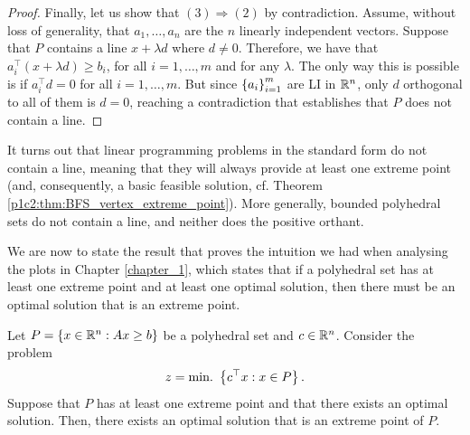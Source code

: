 \begin{proof}
	Finally, let us show that $(3) \Rightarrow (2)$ by contradiction. Assume, without loss of generality, that $a_1, \dots, a_n$ are the $n$ linearly independent vectors. Suppose that $P$ contains a line $x + \lambda d$ where $d \neq 0$. Therefore, we have that $a_i^\top (x+\lambda d) \ge b_i$, for all $i = 1, \dots, m$ and for any $\lambda$. The only way this is possible is if $a_i^\top d =0$ for all $i = 1, \dots, m$. But since $\left\{ a_i \right \}_{i=1}^m$ are LI in $\mathbb{R}^n$, only $d$ orthogonal to all of them is $d=0$, reaching a contradiction that establishes that $P$ does not contain a line.
\end{proof}


It turns out that linear programming problems in the standard form do not contain a line, meaning that they will always provide at least one extreme point (and, consequently, a basic feasible solution, cf. Theorem \ref{p1c2:thm:BFS_vertex_extreme_point}). More generally, bounded polyhedral sets do not contain a line, and neither does the positive orthant.

We are now to state the result that proves the intuition we had when analysing the plots in Chapter \ref{chapter_1}, which states that if a polyhedral set has at least one extreme point and at least one optimal solution, then there must be an optimal solution that is an extreme point.

\begin{theorem}\label{p1c3:thm:opt_extreme}
		Let $P = \left\{ x \in \mathbb{R}^n : Ax \geq b \right \}$ be a polyhedral set and $c \in \mathbb{R}^n$. Consider the problem 
			\begin{equation*}
		    		z = \mathop{\text{min.~}}\left\{ c^\top x : x \in P \right \}.					
			\end{equation*}
		Suppose that $P$ has at least one extreme point and that there exists an optimal solution. Then, there exists an optimal solution that is an extreme point of $P$.
\end{theorem}

